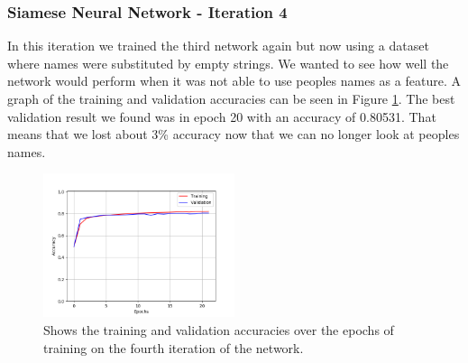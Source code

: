 \subsubsection{Siamese Neural Network - Iteration 4}

In this iteration we trained the third network again but now using a dataset
where names were substituted by empty strings. We wanted to see how well the
network would perform when it was not able to use peoples names as a feature.
A graph of the training and validation accuracies can be seen in Figure
\ref{fig:network_4_accuracies}. The best validation result we found was in epoch
20 with an accuracy of 0.80531. That means that we lost about 3\% accuracy now
that we can no longer look at peoples names.

\begin{figure}
    \centering
    \includegraphics[width=0.5\textwidth]{./pictures/experiments/network_4_accuracies.png}
    \caption{Shows the training and validation accuracies over the epochs of
        training on the fourth iteration of the network.}
    \label{fig:network_4_accuracies}
\end{figure}

